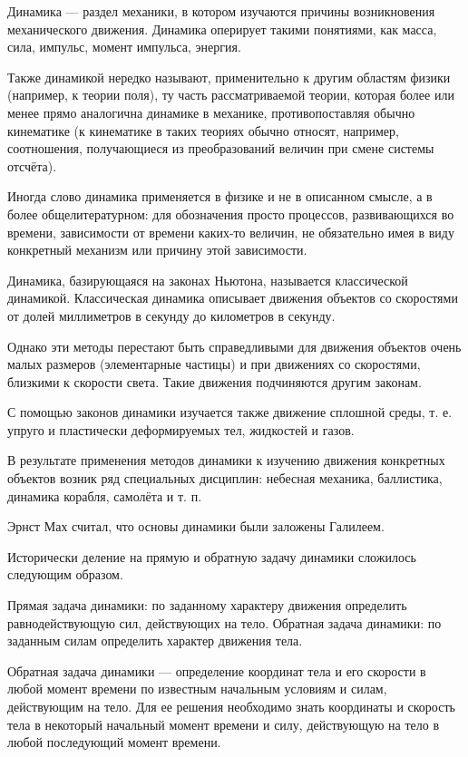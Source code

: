 Динамика — раздел механики, в котором изучаются причины возникновения механического движения. Динамика оперирует такими понятиями, как масса, сила, импульс, момент импульса, энергия.

Также динамикой нередко называют, применительно к другим областям физики (например, к теории поля), ту часть рассматриваемой теории, которая более или менее прямо аналогична динамике в механике, противопоставляя обычно кинематике (к кинематике в таких теориях обычно относят, например, соотношения, получающиеся из преобразований величин при смене системы отсчёта).

Иногда слово динамика применяется в физике и не в описанном смысле, а в более общелитературном: для обозначения просто процессов, развивающихся во времени, зависимости от времени каких-то величин, не обязательно имея в виду конкретный механизм или причину этой зависимости.

Динамика, базирующаяся на законах Ньютона, называется классической динамикой. Классическая динамика описывает движения объектов со скоростями от долей миллиметров в секунду до километров в секунду.

Однако эти методы перестают быть справедливыми для движения объектов очень малых размеров (элементарные частицы) и при движениях со скоростями, близкими к скорости света. Такие движения подчиняются другим законам.

С помощью законов динамики изучается также движение сплошной среды, т. е. упруго и пластически деформируемых тел, жидкостей и газов.

В результате применения методов динамики к изучению движения конкретных объектов возник ряд специальных дисциплин: небесная механика, баллистика, динамика корабля, самолёта и т. п.

Эрнст Мах считал, что основы динамики были заложены Галилеем.

Исторически деление на прямую и обратную задачу динамики сложилось следующим образом.

Прямая задача динамики: по заданному характеру движения определить равнодействующую сил, действующих на тело.
Обратная задача динамики: по заданным силам определить характер движения тела.

Обратная задача динамики — определение координат тела и его скорости в любой момент времени по известным начальным условиям и силам, действующим на тело. Для ее решения необходимо знать координаты и скорость тела в некоторый начальный момент времени и силу, действующую на тело в любой последующий момент времени.

